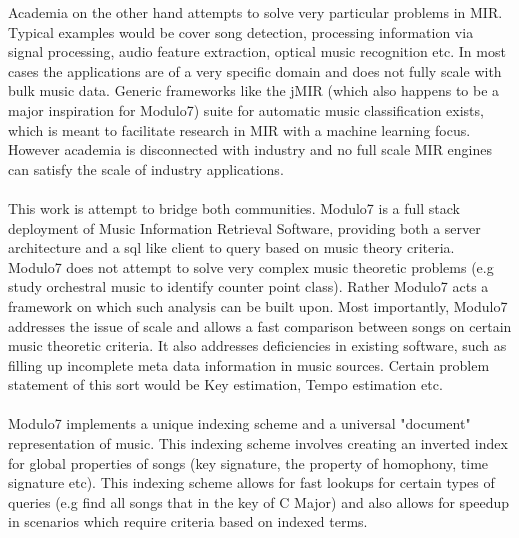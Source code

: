 Academia on the other hand attempts to solve very particular problems in MIR. Typical examples would be cover song detection, processing information via signal processing, audio feature extraction, optical music recognition etc. In most cases the applications are of a very specific domain and does not fully scale with bulk music data. Generic frameworks like the jMIR \cite{jMIR} (which also happens to be a major inspiration for Modulo7) suite for automatic music classification exists, which is meant to facilitate research in MIR with a machine learning focus. However academia is disconnected with industry and no full scale MIR engines can satisfy the scale of industry applications. \\\\
This work is attempt to bridge both communities. Modulo7 is a full stack deployment of Music Information Retrieval Software, providing both a server architecture and a sql like client to query based on music theory criteria. Modulo7 does not attempt to solve very complex music theoretic problems (e.g study orchestral music to identify counter point class). Rather Modulo7 acts a framework on which such analysis can be built upon. Most importantly, Modulo7 addresses the issue of scale and allows a fast comparison between songs on certain music theoretic criteria. It also addresses deficiencies in existing software, such as filling up incomplete meta data information in music sources. Certain problem statement of this sort would be Key estimation, Tempo estimation etc. \\\\
Modulo7 implements a unique indexing scheme and a universal "document" representation of music. This indexing scheme involves creating an inverted index for global properties of songs (key signature, the property of homophony, time signature etc). This indexing scheme allows for fast lookups for certain types of queries (e.g find all songs that in the key of C Major) and also allows for speedup in scenarios which require criteria based on indexed terms. 